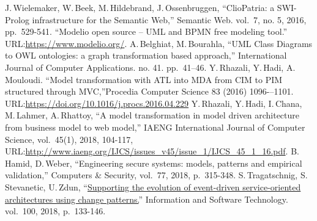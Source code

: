 \documentclass[conference]{IEEEtran} \IEEEoverridecommandlockouts
\begin{document}
\begin{thebibliography}{99}

 J.\,Wielemaker, W.\,Beek, M.\,Hildebrand, J.\,Ossenbruggen, ``ClioPatria: a SWI-Prolog infrastructure for the Semantic Web,'' Semantic Web. vol.~7, no. 5, 2016, pp.~529-541.  ``Modelio open source -- UML and BPMN free modeling tool.'' URL:\url{https://www.modelio.org/}.  A.\,Belghiat, M.\,Bourahla, ``UML Class Diagrams to OWL ontologies: a graph transformation based approach,'' International Journal of Computer Applications. no. 41. pp.~41--46. Y.\,Rhazali, Y.\,Hadi, A.\,Mouloudi. ``Model transformation with ATL into MDA from CIM to PIM structured through MVC,''Procedia Computer Science 83 (2016) 1096-–1101. URL:\url{https://doi.org/10.1016/j.procs.2016.04.229}  Y.\,Rhazali, Y.\,Hadi, I.\,Chana, M.\,Lahmer, A.\,Rhattoy, ``A model transformation in model driven architecture from business model to web model,'' IAENG International Journal of Computer Science, vol.~45(1), 2018, 104-117, URL:\url{http://www.iaeng.org/IJCS/issues_v45/issue_1/IJCS_45_1_16.pdf}.  B.\,Hamid, D.\,Weber, ``Engineering secure systems: models, patterns and empirical validation,'' Computers \& Security, vol.~77, 2018, p.~315-348.  S.\,Tragatschnig, S.\,Stevanetic, U.\,Zdun, ``\href{https://www.sciencedirect.com/science/article/abs/pii/S0950584916303251}{Supporting the evolution of event-driven service-oriented architectures using change patterns.}'' Information and Software Technology. vol.~100, 2018, p.~133-146.


\end{thebibliography}
\end{document}
